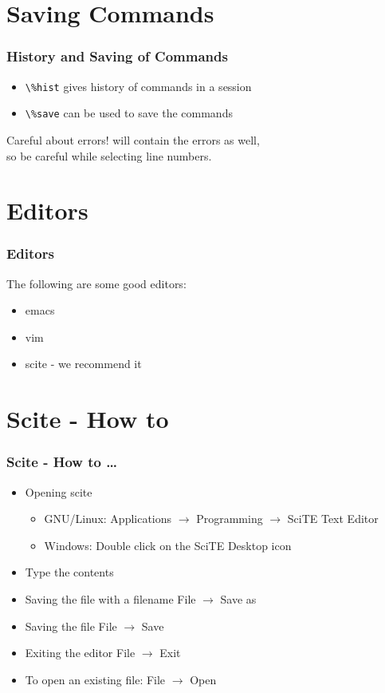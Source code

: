 \documentclass[14pt,compress]{beamer}
\newcommand{\typ}[1]{\lstinline{#1}}
\newcommand{\kwrd}[1]{ \texttt{\textbf{\color{blue}{#1}}}  }
\begin{document}
\section{Saving Commands}
\begin{frame}[fragile]
\frametitle{History and Saving of Commands}
\begin{itemize}
\item \typ{\%hist} gives history of commands in a session
\item \typ{\%save} can be used to save the commands
\end{itemize}
\begin{block}{Careful about errors!}
  \kwrd{\%hist} will contain the errors as well,\\
  so be careful while selecting line numbers.
\end{block}
\end{frame}

\section{Editors}
\begin{frame}[fragile]
  \frametitle{Editors}
  The following are some good editors:
  \begin{itemize}
  \item emacs
  \item vim
  \item \alert{scite} - we recommend it
  \end{itemize}
\end{frame}

\section{Scite - How to}
\begin{frame}[fragile]
  \frametitle{Scite - How to \ldots}
  \begin{itemize}
  \item Opening scite
    \begin{itemize}
    \item GNU/Linux: \alert{Applications} $\rightarrow$ \alert{Programming} $\rightarrow$ \alert{SciTE Text Editor}
    \item Windows: Double click on the \alert{SciTE} Desktop icon
    \end{itemize}
  \item Type the contents
  \item Saving the file with a filename \alert{File $\rightarrow$ Save as}
  \item Saving the file  \alert{File $\rightarrow$ Save}
  \item Exiting the editor  \alert{File $\rightarrow$ Exit}
  \item To open an existing file: \alert{File $\rightarrow$ Open}
  \end{itemize}
\end{frame}
\end{document}
